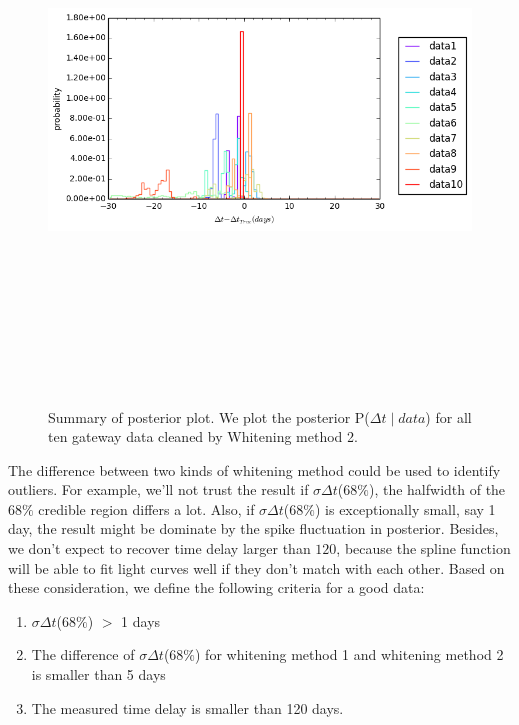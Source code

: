 \documentclass[\docopts]{\docclass}
\begin{document}
\begin{figure}[!h]
\includegraphics[width=\textwidth, height=15cm, keepaspectratio]{summary_posterior_summary_newWhiten.png}
\caption{Summary of posterior plot. We plot the posterior P($\Delta t \mid data$) for all ten gateway data cleaned by Whitening method 2.}
\label{fig:summary_post_newWhiten}
\end{figure}

The difference between two kinds of whitening method could be used to identify outliers. For example, we'll not trust the result if $\sigma\Delta t$($68\%$), the halfwidth of the $68\%$ credible region differs a lot. Also, if $\sigma\Delta t$($68\%$) is exceptionally small, say 1 day, the result might be dominate by the spike fluctuation in posterior. Besides, we don't expect to recover time delay larger than $120$, because the spline function will be able to fit light curves well if  they don't match with each other.  Based on these consideration, we define the following criteria for a good data:
\begin{enumerate}
\item $\sigma\Delta t$($68\%$) $>$ 1 days
\item The difference of $\sigma\Delta t$($68\%$) for whitening method 1 and whitening method 2 is smaller than 5 days
\item The measured time delay is smaller than 120 days. 
\end{enumerate}
\end{document}
